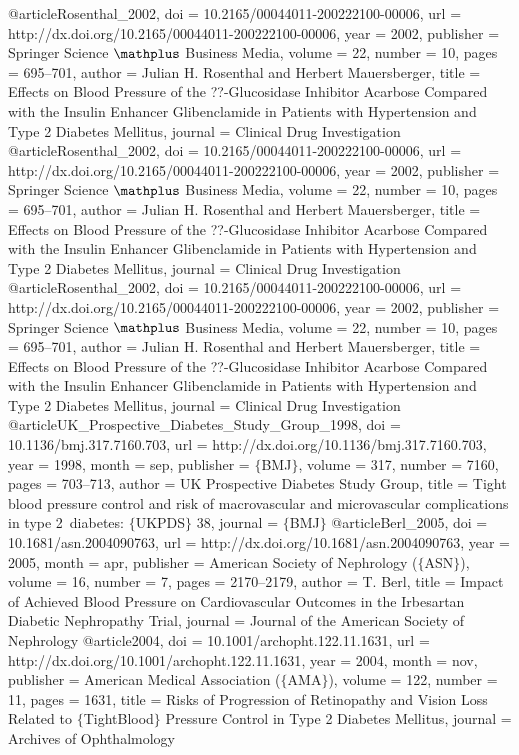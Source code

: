 @article{Rosenthal_2002,
	doi = {10.2165/00044011-200222100-00006},
	url = {http://dx.doi.org/10.2165/00044011-200222100-00006},
	year = 2002,
	publisher = {Springer Science $\mathplus$ Business Media},
	volume = {22},
	number = {10},
	pages = {695--701},
	author = {Julian H. Rosenthal and Herbert Mauersberger},
	title = {Effects on Blood Pressure of the ??-Glucosidase Inhibitor Acarbose Compared with the Insulin Enhancer Glibenclamide in Patients with Hypertension and Type 2 Diabetes Mellitus},
	journal = {Clinical Drug Investigation}
}
@article{Rosenthal_2002,
	doi = {10.2165/00044011-200222100-00006},
	url = {http://dx.doi.org/10.2165/00044011-200222100-00006},
	year = 2002,
	publisher = {Springer Science $\mathplus$ Business Media},
	volume = {22},
	number = {10},
	pages = {695--701},
	author = {Julian H. Rosenthal and Herbert Mauersberger},
	title = {Effects on Blood Pressure of the ??-Glucosidase Inhibitor Acarbose Compared with the Insulin Enhancer Glibenclamide in Patients with Hypertension and Type 2 Diabetes Mellitus},
	journal = {Clinical Drug Investigation}
}
@article{Rosenthal_2002,
	doi = {10.2165/00044011-200222100-00006},
	url = {http://dx.doi.org/10.2165/00044011-200222100-00006},
	year = 2002,
	publisher = {Springer Science $\mathplus$ Business Media},
	volume = {22},
	number = {10},
	pages = {695--701},
	author = {Julian H. Rosenthal and Herbert Mauersberger},
	title = {Effects on Blood Pressure of the ??-Glucosidase Inhibitor Acarbose Compared with the Insulin Enhancer Glibenclamide in Patients with Hypertension and Type 2 Diabetes Mellitus},
	journal = {Clinical Drug Investigation}
}
@article{UK_Prospective_Diabetes_Study_Group_1998,
	doi = {10.1136/bmj.317.7160.703},
	url = {http://dx.doi.org/10.1136/bmj.317.7160.703},
	year = 1998,
	month = {sep},
	publisher = {$\lbrace$BMJ$\rbrace$},
	volume = {317},
	number = {7160},
	pages = {703--713},
	author = {UK Prospective Diabetes Study Group},
	title = {Tight blood pressure control and risk of macrovascular and microvascular complications in type 2~diabetes: $\lbrace$UKPDS$\rbrace$ 38},
	journal = {$\lbrace$BMJ$\rbrace$}
}
@article{Berl_2005,
	doi = {10.1681/asn.2004090763},
	url = {http://dx.doi.org/10.1681/asn.2004090763},
	year = 2005,
	month = {apr},
	publisher = {American Society of Nephrology ($\lbrace$ASN$\rbrace$)},
	volume = {16},
	number = {7},
	pages = {2170--2179},
	author = {T. Berl},
	title = {Impact of Achieved Blood Pressure on Cardiovascular Outcomes in the Irbesartan Diabetic Nephropathy Trial},
	journal = {Journal of the American Society of Nephrology}
}
@article{2004,
	doi = {10.1001/archopht.122.11.1631},
	url = {http://dx.doi.org/10.1001/archopht.122.11.1631},
	year = 2004,
	month = {nov},
	publisher = {American Medical Association ($\lbrace$AMA$\rbrace$)},
	volume = {122},
	number = {11},
	pages = {1631},
	title = {Risks of Progression of Retinopathy and Vision Loss Related to $\lbrace$TightBlood$\rbrace$ Pressure Control in Type 2 Diabetes Mellitus},
	journal = {Archives of Ophthalmology}
}
